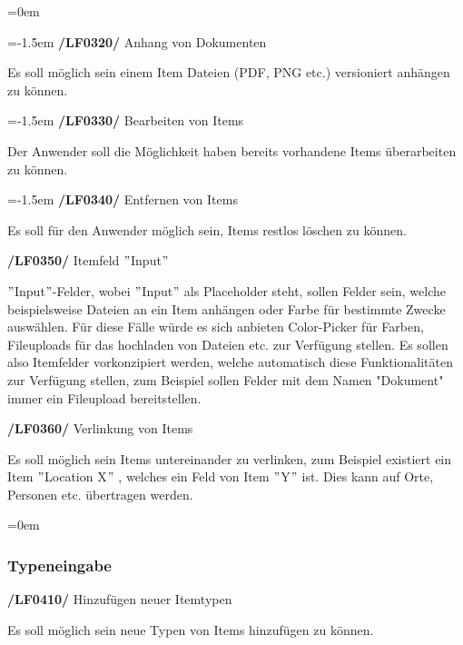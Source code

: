 \documentclass[11pt,a4paper]{report}
\begin{document}
\leftskip=0em

\leftskip=-1.5em
\textbf{/LF0320/} Anhang von Dokumenten
\par
\begingroup
\leftskip=1cm
\noindent Es soll möglich sein einem Item Dateien (PDF, PNG etc.) versioniert anhängen zu können.\\
\par
\endgroup

\leftskip=-1.5em
\textbf{/LF0330/} Bearbeiten von Items
\par
\begingroup
\leftskip=1cm
\noindent Der Anwender soll die Möglichkeit haben bereits vorhandene Items überarbeiten zu können.\\
\par
\endgroup

\leftskip=-1.5em
\textbf{/LF0340/} Entfernen von Items
\par
\begingroup
\leftskip=1cm
\noindent Es soll für den Anwender möglich sein, Items restlos löschen zu können.\\
\par
\endgroup

\textbf{/LF0350/} Itemfeld $"$Input$"$
\par
\begingroup
\leftskip=1cm
\noindent $"$Input$"$-Felder, wobei $"$Input$"$ als Placeholder steht, sollen Felder sein, welche beispielsweise Dateien an ein Item anhängen oder Farbe für bestimmte Zwecke auswählen. 
Für diese Fälle würde es sich anbieten Color-Picker für Farben, Fileuploads für das hochladen von Dateien etc. zur Verfügung stellen. 
Es sollen also Itemfelder vorkonzipiert werden, welche automatisch diese Funktionalitäten zur Verfügung stellen, zum Beispiel sollen Felder mit dem Namen "Dokument" immer ein Fileupload bereitstellen.\\
\par
\endgroup

\textbf{/LF0360/} Verlinkung von Items
\par
\begingroup
\leftskip=1cm
\noindent Es soll möglich sein Items untereinander zu verlinken, zum Beispiel existiert ein Item $"$Location X$"$ , welches ein Feld von Item $"$Y$"$ ist.
Dies kann auf Orte, Personen etc. übertragen werden.\\
\par
\endgroup

\leftskip=0em
\subsubsection{Typeneingabe}

\textbf{/LF0410/} Hinzufügen neuer Itemtypen
\par
\begingroup
\leftskip=1cm
\noindent Es soll möglich sein neue Typen von Items hinzufügen zu können.\\
\par
\endgroup
\end{document}
